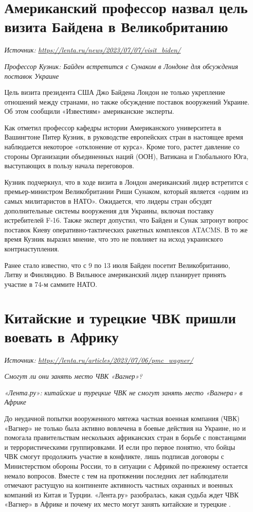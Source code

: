 \newpage
\section{Американский профессор назвал цель визита Байдена в Великобританию}

\textit{Источник: \url{https://lenta.ru/news/2023/07/07/visit_biden/}}

\textit{Профессор Кузник: Байден встретится с Сунаком в Лондоне для обсуждения поставок Украине}

Цель визита президента США Джо Байдена Лондон не только укрепление отношений между странами, но также обсуждение поставок вооружений Украине. Об этом сообщили «Известиям» американские эксперты.

Как отметил профессор кафедры истории Американского университета в Вашингтоне Питер Кузник, в руководстве европейских стран в настоящее время наблюдается некоторое «отклонение от курса». Кроме того, растет давление со стороны Организации объединенных наций (ООН), Ватикана и Глобального Юга, выступающих в пользу начала переговоров.

Кузник подчеркнул, что в ходе визита в Лондон американский лидер встретится с премьер-министром Великобритании Риши Сунаком, который является «одним из самых  милитаристов в НАТО». Ожидается, что лидеры стран обсудят дополнительные системы вооружения для Украины, включая поставку истребителей F-16. Также эксперт допустил, что Байден и Сунак затронут вопрос поставок Киеву оперативно-тактических ракетных комплексов ATACMS. В то же время Кузник выразил мнение, что это не повлияет на исход украинского контрнаступления.

Ранее стало известно, что с 9 по 13 июля Байден посетит Великобританию, Литву и Финляндию. В Вильнюсе американский лидер планирует принять участие в 74-м саммите НАТО.

\newpage
\section{Китайские и турецкие ЧВК пришли воевать в Африку}

\textit{Источник: \url{https://lenta.ru/articles/2023/07/06/pmc_wagner/}}

\textit{Смогут ли они занять место ЧВК «Вагнер»?}

\textit{«Лента.ру»: китайские и турецкие ЧВК не смогут занять место «Вагнера» в Африке}

До неудачной попытки вооруженного мятежа частная военная компания (ЧВК) «Вагнер» не только была активно вовлечена в боевые действия на Украине, но и помогала правительствам нескольких африканских стран в борьбе с повстанцами и террористическими группировками. И если про первое понятно, что бойцы ЧВК смогут продолжить участие в конфликте, лишь подписав договоры с Министерством обороны России, то в ситуации с Африкой по-прежнему остается немало вопросов. Вместе с тем на протяжении последних лет наблюдатели отмечают растущую на континенте активность частных охранных и военных компаний из Китая и Турции. «Лента.ру» разобралась, какая судьба ждет  ЧВК «Вагнер» в Африке и почему их место могут занять китайские и турецкие .

